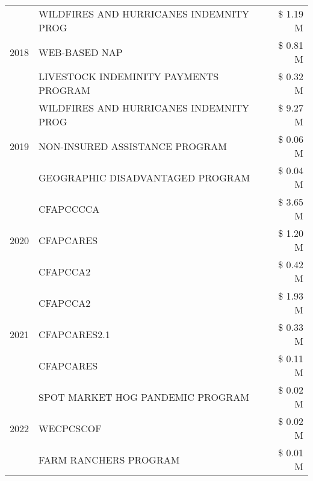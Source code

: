 \begin{tabular}{llr}
\cline{1-3}
\multirow[t]{3}{*}{2018} & WILDFIRES AND HURRICANES INDEMNITY PROG & \$ 1.19 M \\
 & WEB-BASED NAP & \$ 0.81 M \\
 & LIVESTOCK INDEMINITY PAYMENTS PROGRAM & \$ 0.32 M \\
\cline{1-3}
\multirow[t]{3}{*}{2019} & WILDFIRES AND HURRICANES INDEMNITY PROG & \$ 9.27 M \\
 & NON-INSURED ASSISTANCE PROGRAM & \$ 0.06 M \\
 & GEOGRAPHIC DISADVANTAGED PROGRAM & \$ 0.04 M \\
\cline{1-3}
\multirow[t]{3}{*}{2020} & CFAPCCCCA & \$ 3.65 M \\
 & CFAPCARES & \$ 1.20 M \\
 & CFAPCCA2 & \$ 0.42 M \\
\cline{1-3}
\multirow[t]{3}{*}{2021} & CFAPCCA2 & \$ 1.93 M \\
 & CFAPCARES2.1 & \$ 0.33 M \\
 & CFAPCARES & \$ 0.11 M \\
\cline{1-3}
\multirow[t]{3}{*}{2022} & SPOT MARKET HOG PANDEMIC PROGRAM & \$ 0.02 M \\
 & WECPCSCOF & \$ 0.02 M \\
 & FARM RANCHERS PROGRAM & \$ 0.01 M \\
\cline{1-3}
\bottomrule
\end{tabular}
